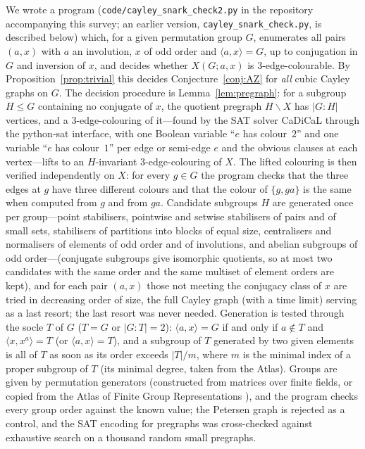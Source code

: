 \documentclass[11pt,a4paper]{article}
\theoremstyle{definition}
\theoremstyle{remark}
\newcommand{\X}[3]{X(#1;#2,#3)}
\begin{document}
We wrote a program (\texttt{code/cayley\_snark\_check2.py} in the repository accompanying this survey; an earlier version, \texttt{cayley\_snark\_check.py}, is described below) which, for a given permutation group $G$, enumerates all pairs $(a,x)$ with $a$ an involution, $x$ of odd order and $\langle a,x\rangle=G$, up to conjugation in $G$ and inversion of $x$, and decides whether $\X{G}{a}{x}$ is $3$-edge-colourable.  By Proposition~\ref{prop:trivial} this decides Conjecture~\ref{conj:AZ} for \emph{all} cubic Cayley graphs on $G$.  The decision procedure is Lemma~\ref{lem:pregraph}: for a subgroup $H\le G$ containing no conjugate of $x$, the quotient pregraph $H\backslash X$ has $|G:H|$ vertices, and a $3$-edge-colouring of it---found by the SAT solver CaDiCaL \cite{CaDiCaL} through the python-sat interface, with one Boolean variable ``$e$ has colour~$2$'' and one variable ``$e$ has colour~$1$'' per edge or semi-edge $e$ and the obvious clauses at each vertex---lifts to an $H$-invariant $3$-edge-colouring of $X$.  The lifted colouring is then verified independently on $X$: for every $g\in G$ the program checks that the three edges at $g$ have three different colours and that the colour of $\{g,ga\}$ is the same when computed from $g$ and from $ga$.  Candidate subgroups $H$ are generated once per group---point stabilisers, pointwise and setwise stabilisers of pairs and of small sets, stabilisers of partitions into blocks of equal size, centralisers and normalisers of elements of odd order and of involutions, and abelian subgroups of odd order---(conjugate subgroups give isomorphic quotients, so at most two candidates with the same order and the same multiset of element orders are kept), and for each pair $(a,x)$ those not meeting the conjugacy class of $x$ are tried in decreasing order of size, the full Cayley graph (with a time limit) serving as a last resort; the last resort was never needed.  Generation is tested through the socle $T$ of $G$ ($T=G$ or $|G:T|=2$): $\langle a,x\rangle=G$ if and only if $a\notin T$ and $\langle x,x^a\rangle=T$ (or $\langle a,x\rangle=T$), and a subgroup of $T$ generated by two given elements is all of $T$ as soon as its order exceeds $|T|/m$, where $m$ is the minimal index of a proper subgroup of $T$ (its minimal degree, taken from the Atlas).  Groups are given by permutation generators (constructed from matrices over finite fields, or copied from the Atlas of Finite Group Representations \cite{ATLAS}), and the program checks every group order against the known value; the Petersen graph is rejected as a control, and the SAT encoding for pregraphs was cross-checked against exhaustive search on a thousand random small pregraphs.
\end{document}
